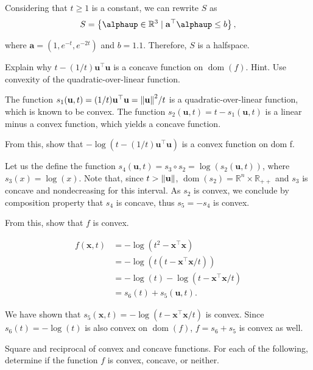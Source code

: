 \documentclass[12pt,a4paper]{article}
\newcommand{\dom}[1]{\ensuremath{\operatorname{dom}\left(#1\right)}} %
\begin{document}
Considering that \(t \geq 1\) is a constant, we can rewrite \(S\) as
\begin{align}
    S = \left\{ \boldsymbol{\alphaup} \in \mathbb{R}^3 \mid \mathbf{a}^\top \boldsymbol{\alphaup} \leq b \right\},
\end{align}

where \(\mathbf{a} = (1, e^{-t}, e^{-2t})\) and \(b=1.1\). Therefore, \(S\) is a halfspace.

\problem

\subproblem Explain why \(t-(1/t)\mathbf{u}^\top \mathbf{u}\) is a concave function on \(\dom{f}\). Hint. Use convexity of the quadratic-over-linear function.

\subanswer
The function \(s_1(\mathbf{u}, t) = (1/t)\mathbf{u}^\top \mathbf{u} = \norm{\mathbf{u}}^2/t\) is a quadratic-over-linear function, which is known to be convex. The function \(s_2(\mathbf{u}, t) = t - s_1(\mathbf{u}, t)\) is a linear minus a convex function, which yields a concave function.

\subproblem From this, show that \(- \log(t - (1/t)\mathbf{u}^\top \mathbf{u})\) is a convex function on dom f.

\subanswer
Let us the define the function \(s_4(\mathbf{u}, t) = s_3 \circ s_2 = \log(s_2(\mathbf{u}, t))\), where \(s_3(x) = \log(x)\). Note that, since \(t > \norm{\mathbf{u}}\), \(\dom{s_2} = \mathbb{R}^{n}\times \mathbb{R}_{++}\) and \(s_3\) is concave and nondecreasing for this interval. As \(s_2\) is convex, we conclude by composition property that \(s_4\) is concave, thus \(s_5 = -s_4\) is convex.

\subproblem From this, show that \(f\) is convex.

\subanswer
\begin{align}
    f(\mathbf{x}, t) & = - \log(t^2 - \mathbf{x}^\top \mathbf{x}) \nonumber \\
                     & = - \log(t(t - \mathbf{x}^\top \mathbf{x}/t)) \nonumber \\
                     & = - \log(t) - \log(t - \mathbf{x}^\top \mathbf{x}/t) \nonumber \\
                     & = s_6(t) + s_5(\mathbf{u}, t).
\end{align}

We have shown that \(s_5(\mathbf{x}, t) = - \log(t - \mathbf{x}^\top \mathbf{x}/t)\) is convex. Since \(s_6(t) = - \log(t)\) is also convex on \(\dom{f}\), \(f = s_6 + s_5\) is convex as well.

\problem Square and reciprocal of convex and concave functions. For each of the following, determine if the function \(f\) is convex, concave, or neither.
\end{document}
